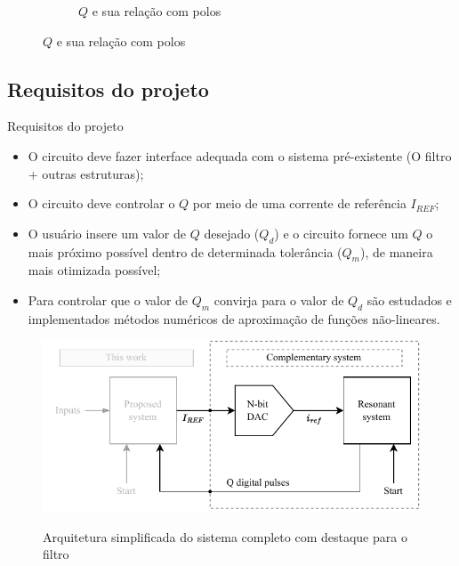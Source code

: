 \begin{frame}{}
\begin{figure}[H]
\begin{subfigure}[H]{.49\textwidth}
        \caption{$Q$ e sua relação com polos}
        \label{f-q-polos}
    \end{subfigure}
    \label{f-q-freq}
\end{figure}

    
\end{frame}


\subsection{Requisitos do projeto}

\begin{frame}{Requisitos do projeto}

\begin{itemize}
    \item O circuito deve fazer interface adequada com o sistema pré-existente (O filtro + outras estruturas);
    \item O circuito deve controlar o $Q$ por meio de uma corrente de referência $I_{REF}$;
    \item O usuário insere um valor de $Q$ desejado ($Q_d$) e o circuito fornece um $Q$ o mais próximo possível dentro de determinada tolerância ($Q_m$), de maneira mais otimizada possível;
    \item Para controlar que o valor de $Q_m$ convirja para o valor de $Q_d$ são estudados e implementados métodos numéricos de aproximação de funções não-lineares.
\end{itemize}
    
\end{frame}

\begin{frame}

\begin{figure}[H]
    \centering
    \caption{Arquitetura simplificada do sistema completo com destaque para o filtro}
    \includegraphics[width=.6\textwidth]{fig/destaque-resonant.pdf}
    \label{f-arq-destaque-resonant}
\end{figure}


    
\end{frame}


